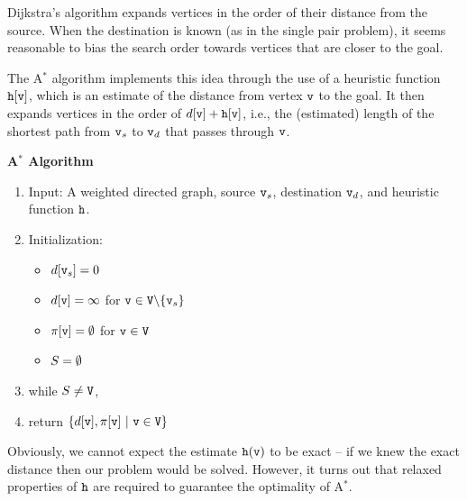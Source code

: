 Dijkstra's algorithm expands vertices in the order of their distance from the source. When the destination is known (as in the single pair problem), it seems reasonable to bias the search order towards vertices that are closer to the goal. 

The A$^*$ algorithm implements this idea through the use of a heuristic function ${\tt h}[{\tt v}]$, which is an estimate of the distance from vertex ${\tt v}$ to the goal. It then expands vertices in the order of $d[{\tt v}] + {\tt h}[{\tt v}]$, i.e., the (estimated) length of the shortest path from ${\tt v}_s$ to ${\tt v}_d$ that passes through ${\tt v}$.

\begin{algorithm_}\textbf{A$^*$ Algorithm}
\begin{enumerate}
\item{Input:} A weighted directed graph, source ${\tt v}_s$, destination ${\tt v}_d$, and heuristic function ${\tt h}$.

\item Initialization:
\begin{itemize}
  \item[] $d[{\tt v}_s] = 0$
  \item[] $d[{\tt v}] = \infty $ for ${\tt v} \in {\tt V}\backslash \{ {\tt v}_s\} $
  \item[] $\pi [{\tt v}] = \emptyset $ for ${\tt v} \in {\tt V}$
  \item[] ${S} = \emptyset $
\end{itemize}

\item while ${S} \ne {\tt V}$,





\item return $\{ d[\nodev],\policy [\nodev] \ |\ \nodev \in \nodes\} $
\end{enumerate}
\end{algorithm_}

Obviously, we cannot expect the estimate ${\tt h}({\tt v})$ to be exact -- if we knew the exact distance then our problem would be solved. However, it turns out that relaxed properties of ${\tt h}$ are required to guarantee the optimality of A$^*$. 

